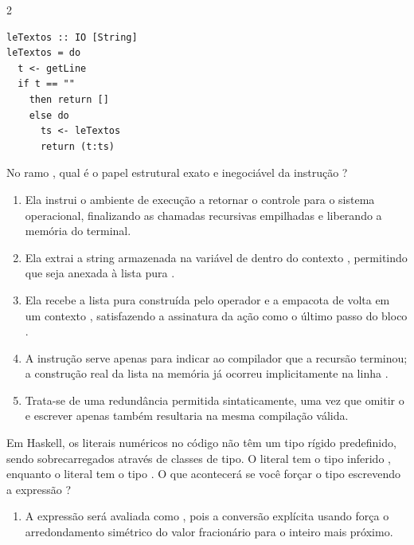 \documentclass[a4paper,10pt,brazil]{article}
\begin{document}
\begin{multicols}{2}
\begin{verbatim}
leTextos :: IO [String]
leTextos = do
  t <- getLine
  if t == "" 
    then return []
    else do
      ts <- leTextos
      return (t:ts)
\end{verbatim}

No ramo , qual é o papel estrutural exato e inegociável da instrução ?

\begin{enumerate}
  \item Ela instrui o ambiente de execução a retornar o controle para o sistema operacional, finalizando as chamadas recursivas empilhadas e liberando a memória do terminal.

  \item Ela extrai a string armazenada na variável  de dentro do contexto , permitindo que seja anexada à lista pura .

  \item Ela recebe a lista pura construída pelo operador \haskellinline{(:)} e a empacota de volta em um contexto , satisfazendo a assinatura da ação como o último passo do bloco .

  \item A instrução  serve apenas para indicar ao compilador que a recursão terminou; a construção real da lista na memória já ocorreu implicitamente na linha .

  \item Trata-se de uma redundância permitida sintaticamente, uma vez que omitir o  e escrever apenas  também resultaria na mesma compilação válida.


\end{enumerate}

Em Haskell, os literais numéricos no código não têm um tipo rígido predefinido, sendo sobrecarregados através de classes de tipo. O literal  tem o tipo inferido , enquanto o literal  tem o tipo . 
O que acontecerá se você forçar o tipo escrevendo a expressão ?

\begin{enumerate}
  \item A expressão será avaliada como , pois a conversão explícita usando \haskellinline{::} força o arredondamento simétrico do valor fracionário para o inteiro mais próximo.


\end{enumerate}
\end{multicols}
\end{document}
